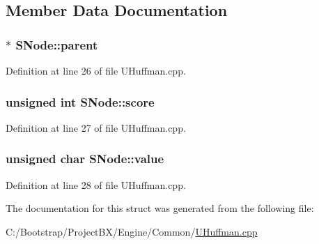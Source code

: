 \subsection{Member Data Documentation}
\hypertarget{struct_s_node_34a7a4584233ff71a079c7cc8af0d540}{
\subsubsection[{parent}]{$\ast$ {\bf SNode::parent}}}
\label{struct_s_node_34a7a4584233ff71a079c7cc8af0d540}




Definition at line 26 of file UHuffman.cpp.\hypertarget{struct_s_node_fdf34ae214ee5ba96cbdefd552dfbd67}{
\subsubsection[{score}]{\setlength{\rightskip}{0pt plus 5cm}unsigned int {\bf SNode::score}}}
\label{struct_s_node_fdf34ae214ee5ba96cbdefd552dfbd67}




Definition at line 27 of file UHuffman.cpp.\hypertarget{struct_s_node_2089f30eda8aa96bbde23af8e2aa53d2}{
\subsubsection[{value}]{\setlength{\rightskip}{0pt plus 5cm}unsigned char {\bf SNode::value}}}
\label{struct_s_node_2089f30eda8aa96bbde23af8e2aa53d2}




Definition at line 28 of file UHuffman.cpp.

The documentation for this struct was generated from the following file:\begin{CompactItemize}
\item 
C:/Bootstrap/ProjectBX/Engine/Common/\hyperlink{_u_huffman_8cpp}{UHuffman.cpp}\end{CompactItemize}
